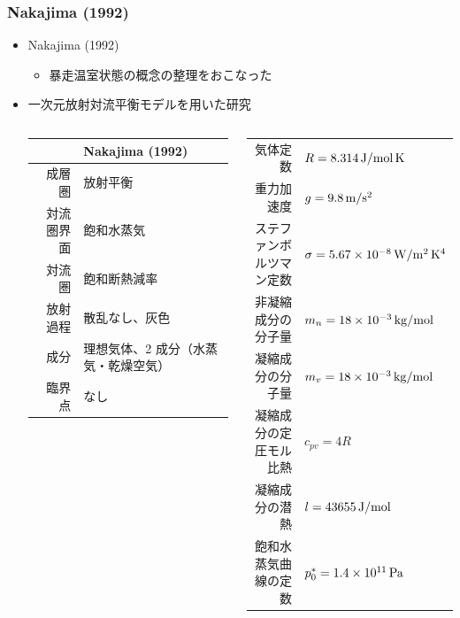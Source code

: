 \documentclass[aspectratio=149,9pt]{beamer}
\newcommand{\hme}[1]{\times10^{#1}}
\begin{document}
\begin{frame}
	\frametitle{Nakajima \etal (1992)}
	\begin{itemize}
		\item Nakajima \etal (1992)
			\begin{itemize}
				\item 暴走温室状態の概念の整理をおこなった
			\end{itemize}
		\item 一次元放射対流平衡モデルを用いた研究
			\begin{columns}[c,onlytextwidth]
				\begin{column}{.6\textwidth}
					\begin{table}
						\small\centering
						\begin{tabular}{rl}
							\hline
							 &Nakajima \etal (1992)\\
							\hline
							成層圏&放射平衡\\
							対流圏界面&飽和水蒸気\\
							対流圏&飽和断熱減率\\
							放射過程&散乱なし、灰色\\
							成分&理想気体、2 成分（水蒸気・乾燥空気）\\
							臨界点&なし\\
							\hline
						\end{tabular}
					\end{table}
				\end{column}
				\begin{column}{.4\textwidth}
					\tiny
					\centering
					\begin{tabular}{rl}
						\hline
						気体定数&\(R=8.314\hmu{J/mol\,K}\)\\
						重力加速度&\(g=9.8\hmu{m/s^2}\)\\
						ステファンボルツマン定数&\(\sigma=5.67\hme{-8}\hmu{W/m^2\,K^4}\)\\
						\hline
						非凝縮成分の分子量&\(m_n=18\hme{-3}\hmu{kg/mol}\)\\
						凝縮成分の分子量&\(m_v=18\hme{-3}\hmu{kg/mol}\)\\
						凝縮成分の定圧モル比熱&\(c_{pv}=4R\)\\
						凝縮成分の潜熱&\(l=43655\hmu{J/mol}\)\\
						飽和水蒸気曲線の定数&\(p^*_0=1.4\hme{11}\hmu{Pa}\)\\

\end{tabular}
\end{column}
\end{columns}
\end{itemize}
\end{frame}
\end{document}
